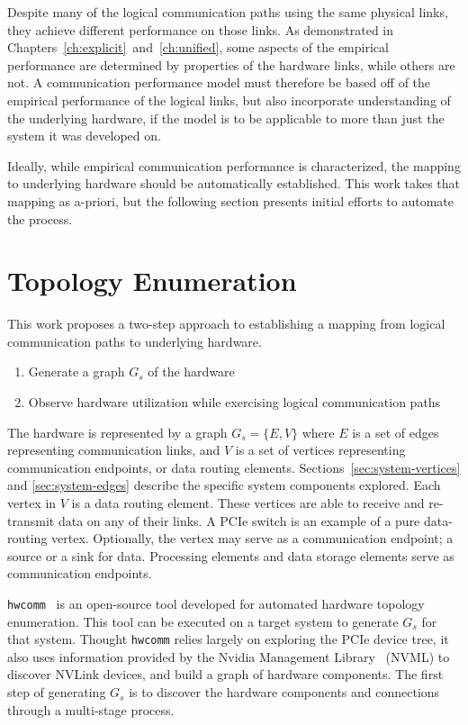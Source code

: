 Despite many of the logical communication paths using the same physical links, they achieve different performance on those links.
As demonstrated in Chapters~\ref{ch:explicit}~and~\ref{ch:unified}, some aspects of the empirical performance are determined by properties of the hardware links, while others are not.
A communication performance model must therefore be based off of the empirical performance of the logical links, but also incorporate understanding of the underlying hardware, if the model is to be applicable to more than just the system it was developed on.

Ideally, while empirical communication performance is characterized, the mapping to underlying hardware should be automatically established.
This work takes that mapping as a-priori, but the following section presents initial efforts to automate the process.

\section{Topology Enumeration}
\label{sec:hardware-enumeration}

This work proposes a two-step approach to establishing a mapping from logical communication paths to underlying hardware.
\begin{enumerate}
    \item Generate a graph $G_s$ of the hardware
    \item Observe hardware utilization while exercising logical communication paths
\end{enumerate}
The hardware is represented by a graph $G_s = \{E,V\}$ where $E$ is a set of edges representing communication links, and $V$ is a set of vertices representing communication endpoints, or data routing elements.
Sections~\ref{sec:system-vertices} and \ref{sec:system-edges} describe the specific system components explored.
Each vertex in $V$ is a data routing element.
These vertices are able to receive and re-transmit data on any of their links.
A PCIe switch is an example of a pure data-routing vertex.
Optionally, the vertex may serve as a communication endpoint; a source or a sink for data.
Processing elements and data storage elements serve as communication endpoints.

\texttt{hwcomm}~\cite{pearson2018hwcomm} is an open-source tool developed for automated hardware topology enumeration.
This tool can be executed on a target system to generate $G_s$ for that system.
Thought \texttt{hwcomm} relies largely on exploring the PCIe device tree, it also uses information provided by the Nvidia Management Library~\cite{nvidia2017nvml} (NVML) to discover NVLink devices, and build a graph of hardware components.
The first step of generating $G_s$ is to discover the hardware components and connections through a multi-stage process.

